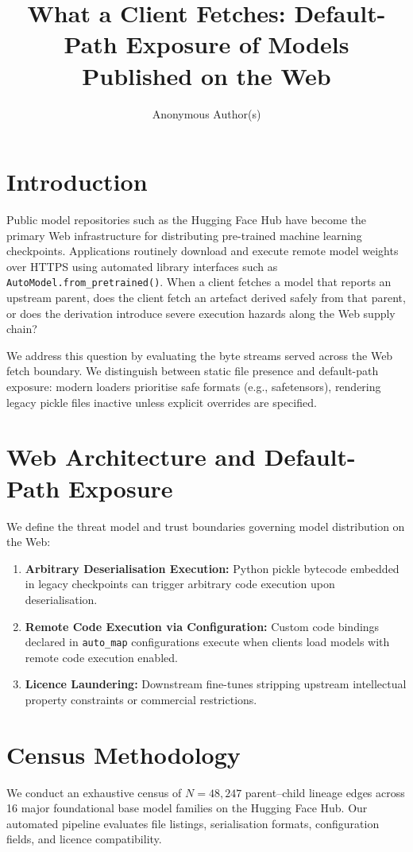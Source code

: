\documentclass[sigconf,anonymous,review]{acmart}
\title[What a Client Fetches]{What a Client Fetches: Default-Path Exposure of Models Published on the Web}
\author{Anonymous Author(s)}
\affiliation{%
  \institution{Anonymous Institution}
  \country{Anonymous Country}
}
\begin{document}
\maketitle

\section{Introduction}
Public model repositories such as the Hugging Face Hub have become the primary Web infrastructure for distributing pre-trained machine learning checkpoints. Applications routinely download and execute remote model weights over HTTPS using automated library interfaces such as \texttt{AutoModel.from\_pretrained()}. When a client fetches a model that reports an upstream parent, does the client fetch an artefact derived safely from that parent, or does the derivation introduce severe execution hazards along the Web supply chain?

We address this question by evaluating the byte streams served across the Web fetch boundary. We distinguish between static file presence and default-path exposure: modern loaders prioritise safe formats (e.g., safetensors), rendering legacy pickle files inactive unless explicit overrides are specified.

\section{Web Architecture and Default-Path Exposure}
We define the threat model and trust boundaries governing model distribution on the Web:
\begin{enumerate}
    \item \textbf{Arbitrary Deserialisation Execution:} Python pickle bytecode embedded in legacy checkpoints can trigger arbitrary code execution upon deserialisation.
    \item \textbf{Remote Code Execution via Configuration:} Custom code bindings declared in \texttt{auto\_map} configurations execute when clients load models with remote code execution enabled.
    \item \textbf{Licence Laundering:} Downstream fine-tunes stripping upstream intellectual property constraints or commercial restrictions.
\end{enumerate}

\section{Census Methodology}
We conduct an exhaustive census of $N = 48{,}247$ parent--child lineage edges across 16 major foundational base model families on the Hugging Face Hub. Our automated pipeline evaluates file listings, serialisation formats, configuration fields, and licence compatibility.
\end{document}
